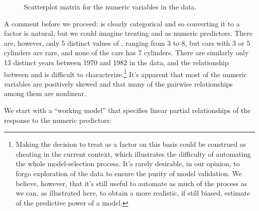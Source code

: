\documentclass[
]{jss}
\begin{document}
\begin{CodeChunk}
\begin{figure}
{}

\caption[Scatterplot matrix for the numeric variables in the  data]{Scatterplot matrix for the numeric variables in the  data.}\label{fig:Auto-explore-scatterplot-matrix}
\end{figure}
\end{CodeChunk}

A comment before we proceed:  is clearly categorical and so
converting it to a factor is natural, but we could imagine treating
 and  as numeric predictors. There are,
however, only 5 distinct values of , ranging from 3 to
8, but cars with 3 or 5 cylinders are rare, and none of the cars has 7
cylinders. There are similarly only 13 distinct years between 1970 and
1982 in the data, and the relationship between  and
 is difficult to characterize.\footnote{Making the decision
  to treat  as a factor on this basis could be construed as
  cheating in the current context, which illustrates the difficulty of
  automating the whole model-selection process. It's rarely desirable,
  in our opinion, to forgo exploration of the data to ensure the purity
  of model validation. We believe, however, that it's still useful to
  automate as much of the process as we can, as illustrated here, to
  obtain a more realistic, if still biased, estimate of the predictive
  power of a model.} It's apparent that most of the numeric variables
are positively skewed and that many of the pairwise relationships among
them are nonlinear.

We start with a ``working model'' that specifies linear partial
relationships of the response to the numeric predictors:
\end{document}
